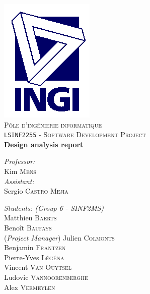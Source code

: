\begin{titlepage}

\rm %

\begin{center}

\includegraphics[scale=.5]{ingi.png}\\[2cm]

\textsc{\LARGE Pôle d'ingénierie informatique}\\[1.5cm]

\textsc{\Large \texttt{LSINF2255} - Software Development Project}\\[0.5cm]


\vspace{3.5cm}
{ \huge \bfseries Design analysis report\vspace{0.8cm}}

\vspace{3.5cm}

\begin{minipage}{0.4\textwidth}
\begin{flushleft} \large
\emph{Professor:}\\
	Kim \textsc{Mens}\\
\vspace{1cm}
\emph{Assistant:}\\
	Sergio \textsc{Castro Mejia} %
\end{flushleft}
\end{minipage}
\begin{minipage}{0.4\textwidth}
\begin{flushright} \large
\emph{Students: (Group 6 - SINF2MS)} \\
	Matthieu \textsc{Baerts}\\
	Benoît \textsc{Baufays}\\
	(\textit{Project Manager}) Julien \textsc{Colmonts}\\
	Benjamin \textsc{Frantzen}\\
	Pierre-Yves \textsc{Légéna}\\
	Vincent \textsc{Van Ouytsel}\\
	Ludovic \textsc{Vannoorenberghe}\\
	Alex \textsc{Vermeylen}
\end{flushright}
\end{minipage}


\end{center}
\end{titlepage}
